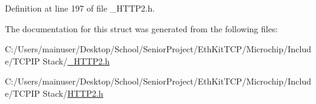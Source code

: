 Definition at line 197 of file \+\_\+\+H\+T\+T\+P2.\+h.



The documentation for this struct was generated from the following files\+:\begin{DoxyCompactItemize}
\item 
C\+:/\+Users/mainuser/\+Desktop/\+School/\+Senior\+Project/\+Eth\+Kit\+T\+C\+P/\+Microchip/\+Include/\+T\+C\+P\+I\+P Stack/\hyperlink{___h_t_t_p2_8h}{\+\_\+\+H\+T\+T\+P2.\+h}\item 
C\+:/\+Users/mainuser/\+Desktop/\+School/\+Senior\+Project/\+Eth\+Kit\+T\+C\+P/\+Microchip/\+Include/\+T\+C\+P\+I\+P Stack/\hyperlink{_h_t_t_p2_8h}{H\+T\+T\+P2.\+h}\end{DoxyCompactItemize}
